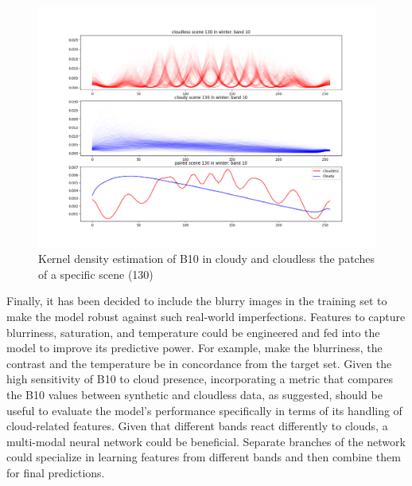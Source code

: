 \begin{figure}[H]
	\centering
	\includegraphics[width=16cm]{imgs/eda/b10-kde}
	\caption{Kernel density estimation of B10 in cloudy and cloudless the patches of a specific scene (130)}
	\label{fig:eda-b10-kde}
\end{figure}
Finally, it has been decided to include the blurry images in the training set to make the model robust against such real-world imperfections. Features to capture blurriness, saturation, and temperature could be engineered and fed into the model to improve its predictive power. For example, make the blurriness, the contrast and the temperature be in concordance from the target set.
Given the high sensitivity of B10 to cloud presence, incorporating a metric that compares the B10 values between synthetic and cloudless data, as suggested, should be useful to evaluate the model's performance specifically in terms of its handling of cloud-related features. Given that different bands react differently to clouds, a multi-modal neural network could be beneficial. Separate branches of the network could specialize in learning features from different bands and then combine them for final predictions.
